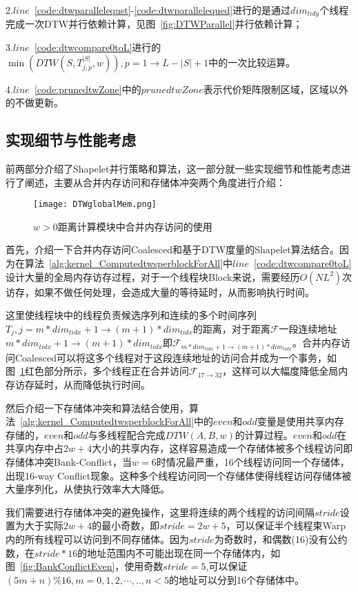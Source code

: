2.$line$~\ref{code:dtwparallelequst}-\ref{code:dtwparallelequed}进行的是通过$dim_{tidy}$个线程完成一次DTW并行依赖计算，见图~\ref{fig:DTWParallel}并行依赖计算；

3.$line$~\ref{code:dtwcompare0toL}进行的$\min(DTW(S,T_{j,p}^{|S|},w)),p=1\to L-|S|+1$中的一次比较运算。

4.$line$~\ref{code:prunedtwZone}中的$prunedtwZone$表示代价矩阵限制区域，区域以外的不做更新。


\subsection{实现细节与性能考虑}
\label{cha:chap04:myalg:DTW:trick}
前两部分介绍了Shapelet并行策略和算法，这一部分就一些实现细节和性能考虑进行了阐述，主要从合并内存访问和存储体冲突两个角度进行介绍：

\begin{figure}[H] %
	\centering
	\texttt{[image: DTWglobalMem.png]}
	\caption{$w>0$距离计算模块中合并内存访问的使用}
	\label{fig:DTWglobalMem}
\end{figure}

首先，介绍一下合并内存访问Coalesced和基于DTW度量的Shapelet算法结合。因为在算法~\ref{alg:kernel_ComputedtwsperblockForAll}中$line$~\ref{code:dtwcompare0toL}设计大量的全局内存访存过程，对于一个线程块Block来说，需要经历$O(NL^2)$次访存，如果不做任何处理，会造成大量的等待延时，从而影响执行时间。

这里使线程块中的线程负责候选序列和连续的多个时间序列$T_j,j=m*dim_{tidx}+1\to (m+1)*dim_{tidx}$的距离，对于距离$\mathcal{F}$一段连续地址$m*dim_{tidx}+1\to (m+1)*dim_{tidx}$即$\mathcal{F}_{m*dim_{tidx}+1\to (m+1)*dim_{tidx}}$。合并内存访问Coalesced可以将这多个线程对于这段连续地址的访问合并成为一个事务，如图~\ref{fig:DTWglobalMem}红色部分所示，多个线程正在合并访问$\mathcal{F}_{17\to 32}$，这样可以大幅度降低全局内存访存延时，从而降低执行时间。

然后介绍一下存储体冲突和算法结合使用，算法~\ref{alg:kernel_ComputedtwsperblockForAll}中的$even$和$odd$变量是使用共享内存存储的，$even$和$odd$与多线程配合完成$DTW(A,B,w)$的计算过程。$even$和$odd$在共享内存中占$2w+4$大小的共享内存，这样容易造成一个存储体被多个线程访问即存储体冲突Bank-Conflict，当$w=6$时情况最严重，16个线程访问同一个存储体，出现16-way Conflict现象。这种多个线程访问同一个存储体使得线程访问存储体被大量序列化，从使执行效率大大降低。

我们需要进行存储体冲突的避免操作，这里将连续的两个线程的访问间隔$stride$设置为大于实际$2w+4$的最小奇数，即$stride=2w+5$，可以保证半个线程束Warp内的所有线程可以访问到不同存储体。因为$stride$为奇数时，和偶数(16)没有公约数，在$stride*16$的地址范围内不可能出现在同一个存储体内，如图~\ref{fig:BankConflictEven}，使用奇数$stride=5$,可以保证$(5m+n)\%16,m=0,1,2,\cdots,..,n < 5$的地址可以分到16个存储体中。

